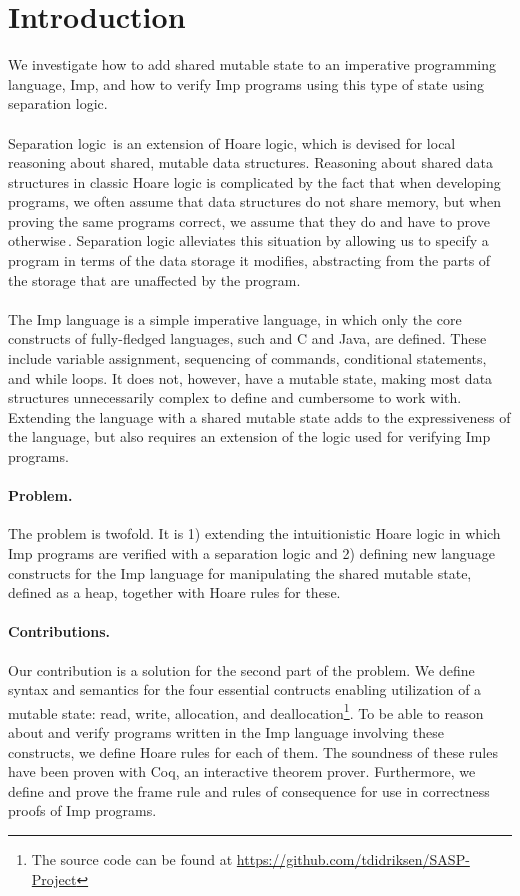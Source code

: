 \section{Introduction}
We investigate how to add shared mutable state to an imperative programming language, Imp, and how to verify Imp programs using this type of state using separation logic.
\paragraph{}
Separation logic\,\cite{Reynolds02} is an extension of Hoare logic, which is devised for local reasoning about shared, mutable data structures. Reasoning about shared data structures in classic Hoare logic is complicated by the fact that when developing programs, we often assume that data structures do not share memory, but when proving the same programs correct, we assume that they do and have to prove otherwise\,\cite{reynolds2008AnIntroductionTo}. Separation logic alleviates this situation by allowing us to specify a program in terms of the data storage it modifies, abstracting from the parts of the storage that are unaffected by the program.
\paragraph{}
The Imp language is a simple imperative language, in which only the core constructs of fully-fledged languages, such and C and Java, are defined. These include variable assignment, sequencing of commands, conditional statements, and while loops. It does not, however, have a mutable state, making most data structures unnecessarily complex to define and cumbersome to work with. Extending the language with a shared mutable state adds to the expressiveness of the language, but also requires an extension of the logic used for verifying Imp programs.

\paragraph{Problem.}
The problem is twofold. It is 1) extending the intuitionistic Hoare logic in which Imp programs are verified with a separation logic and 2) defining new language constructs for the Imp language for manipulating the shared mutable state, defined as a heap, together with Hoare rules for these.


\paragraph{Contributions.}
Our contribution is a solution for the second part of the problem. We define syntax and semantics for the four essential contructs enabling utilization of a mutable state: read, write, allocation, and deallocation\footnote{The source code can be found at \url{https://github.com/tdidriksen/SASP-Project}}. To be able to reason about and verify programs written in the Imp language involving these constructs, we define Hoare rules for each of them. The soundness of these rules have been proven with Coq, an interactive theorem prover. Furthermore, we define and prove the frame rule and rules of consequence for use in correctness proofs of Imp programs.

